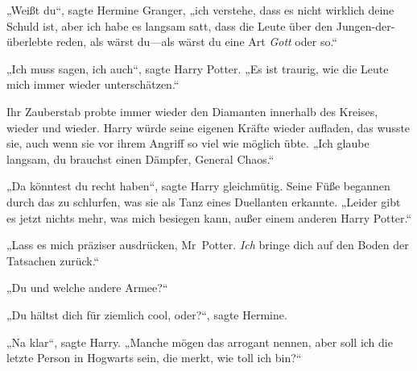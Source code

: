 „Weißt du“, sagte Hermine Granger, „ich verstehe, dass es nicht wirklich deine Schuld ist, aber ich habe es langsam satt, dass die Leute über den Jungen-der-überlebte reden, als wärst du—als wärst du eine Art \emph{Gott} oder so.“

„Ich muss sagen, ich auch“, sagte Harry Potter. „Es ist traurig, wie die Leute mich immer wieder unterschätzen.“

Ihr Zauberstab probte immer wieder den Diamanten innerhalb des Kreises, wieder und wieder. Harry würde seine eigenen Kräfte wieder aufladen, das wusste sie, auch wenn sie vor ihrem Angriff so viel wie möglich übte. „Ich glaube langsam, du brauchst einen Dämpfer, General Chaos.“

„Da könntest du recht haben“, sagte Harry gleichmütig. Seine Füße begannen durch das zu schlurfen, was sie als Tanz eines Duellanten erkannte. „Leider gibt es jetzt nichts mehr, was mich besiegen kann, außer einem anderen Harry Potter.“

„Lass es mich präziser ausdrücken, Mr~Potter. \emph{Ich} bringe dich auf den Boden der Tatsachen zurück.“

„Du und welche andere Armee?“

„Du hältst dich für ziemlich cool, oder?“, sagte Hermine.

„Na klar“, sagte Harry. „Manche mögen das arrogant nennen, aber soll ich die letzte Person in Hogwarts sein, die merkt, wie toll ich bin?“

